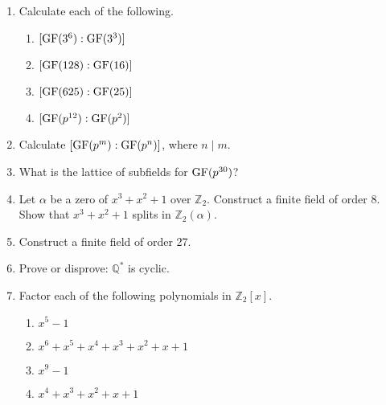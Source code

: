  
{\small
\begin{enumerate}

\item
Calculate each of the following.
\begin{multicols}{2}
\begin{enumerate}

\item 
$[\operatorname{GF}(3^6) : \operatorname{GF}(3^3)]$

\item 
$[\operatorname{GF}(128): \operatorname{GF}(16)]$

\item 
$[\operatorname{GF}(625) : \operatorname{GF}(25) ]$

\item 
$[\operatorname{GF}(p^{12}): \operatorname{GF}(p^2)]$


\end{enumerate}
\end{multicols}



\item
Calculate $[\operatorname{GF}(p^m): \operatorname{GF}(p^n)]$, where $n \mid m$.


\item
What is the lattice of subfields for $\operatorname{GF}(p^{30})$?


\item
Let $\alpha$ be a zero of $x^3 + x^2 + 1$ over ${\mathbb Z}_2$. 
Construct a finite field of order 8. Show that
$x^3 + x^2 + 1$ splits in ${\mathbb Z}_2(\alpha)$. 
 

\item
Construct a finite field of order 27.


\item
Prove or disprove: ${\mathbb Q}^\ast$ is cyclic.

 
\item
Factor each of the following polynomials in ${\mathbb Z}_2[x]$.
\begin{multicols}{2}
\begin{enumerate}

\item 
$x^5- 1$

\item 
$x^6 + x^5 + x^4 + x^3 + x^2 + x + 1$

\item 
$x^9 - 1$

\item 
$x^4 +x^3 + x^2 + x + 1$ 


\end{enumerate}
\end{multicols}




\end{enumerate}}
